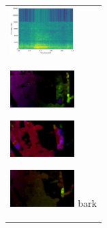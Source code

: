 \begin{enumerate}
\begin{end}
\begin{figure}[H]
\begin{tabular}{l}
\begin{minipage}{0.165\hsize}
\begin{center}
        \end{center}
      \end{minipage}
      \begin{minipage}{0.165\hsize}
        \begin{center}
          \includegraphics[clip, width=2.5cm]{./Figures/sound_bark.eps}
        \end{center}
      \end{minipage}
\\  %
      \begin{minipage}{0.165\hsize}
        \begin{center}
          \includegraphics[clip, width=2.5cm]{./Figures/optic_bark1.eps}
          \hspace{0.3cm} { }
        \end{center}
      \end{minipage}
      \begin{minipage}{0.165\hsize}
        \begin{center}
          \includegraphics[clip, width=2.5cm]{./Figures/optic_bark2.eps}
          \hspace{0.0cm} { }
        \end{center}
      \end{minipage}
      \begin{minipage}{0.165\hsize}
        \begin{center}
          \includegraphics[clip, width=2.5cm]{./Figures/optic_bark3.eps}
          \hspace{0.0cm} {bark}
        \end{center}
      \end{minipage}
      \begin{minipage}{0.165\hsize}

\end{minipage}
\end{tabular}
\end{figure}
\end{end}
\end{enumerate}
